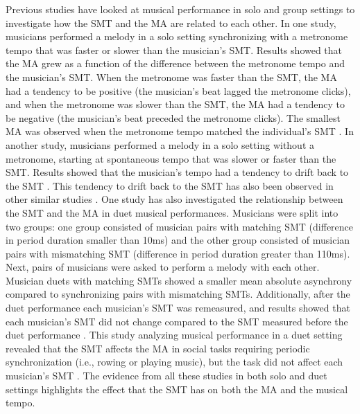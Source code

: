 \documentclass[10pt,letterpaper]{article}
\begin{document}
Previous studies have looked at musical performance in solo and group settings to investigate how the SMT and the MA are related to each other. In one study, musicians performed a melody in a solo setting synchronizing with a metronome tempo that was faster or slower than the musician's SMT. Results showed that the MA grew as a function of the difference between the metronome tempo and the musician's SMT. When the metronome was faster than the SMT, the MA had a tendency to be positive (the musician's beat lagged the metronome clicks), and when the metronome was slower than the SMT, the MA had a tendency to be negative (the musician's beat preceded the metronome clicks). The smallest MA was observed when the metronome tempo matched the individual's SMT \cite{scheurich2018tapping}. In another study, musicians performed a melody in a solo setting without a metronome, starting at spontaneous tempo that was slower or faster than the SMT. Results showed that the musician's tempo had a tendency to drift back to the SMT \cite{zamm2018musicians}. This tendency to drift back to the SMT has also been observed in other similar studies \cite{mcauley2006time, yu2003task}. One study has also investigated the relationship between the SMT and the MA in duet musical performances. Musicians were split into two groups: one group consisted of musician pairs with matching SMT (difference in period duration smaller than 10ms) and the other group consisted of musician pairs with mismatching SMT (difference in period duration greater than 110ms). Next, pairs of musicians were asked to perform a melody with each other. Musician duets with matching SMTs showed a smaller mean absolute asynchrony compared to synchronizing pairs with mismatching SMTs. Additionally, after the duet performance each musician's SMT was remeasured, and results showed that each musician's SMT did not change compared to the SMT measured before the duet performance \cite{zamm2016endogenous}. This study analyzing musical performance in a duet setting revealed that the SMT affects the MA in social tasks requiring periodic synchronization (i.e., rowing or playing music), but the task did not affect each musician's SMT \cite{zamm2016endogenous}. The evidence from all these studies in both solo and duet settings highlights the effect that the SMT has on both the MA and the musical tempo.
\end{document}
